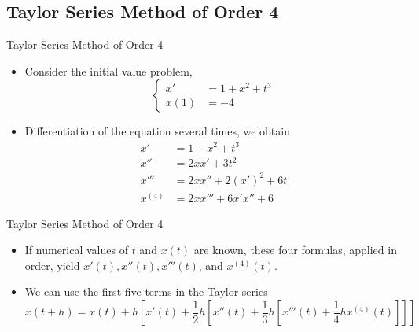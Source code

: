 \documentclass{beamer}
\begin{document}
\subsection[Taylor Series Method of Order 4]{Taylor Series Method of Order 4}
\begin{frame}{Taylor Series Method of Order 4}
\begin{itemize}
\item Consider the initial value problem,
\[
\left\{
\begin{split}
x'&=1+x^2 +t^3\\ 
x(1) &= -4
\end{split}\right.
\]
\item Differentiation of the equation several times, we obtain
\begin{align*}
x'&=1+x^2+t^3\\
x''&=2xx'+3t^2\\
x'''&=2xx''+2(x')^2+6t\\
x^{(4)}&= 2xx'''+6x'x''+6
\end{align*}
\end{itemize}

\end{frame}

\begin{frame}{Taylor Series Method of Order 4}
\begin{itemize}
\item If numerical values of $t$ and $x(t)$ are known, these four formulas, applied in order, yield $x'(t), x''(t), x'''(t)$, and $x^{(4)}(t)$.
\item We can use the first \alert{five} terms in the Taylor series
\[
x(t+h)= x(t)+h\left[x'(t)+\frac{1}{2}h\left[x''(t)+\frac{1}{3}h\left[x'''(t)+\frac{1}{4}hx^{(4)}(t)\right]\right]\right]
\]
\end{itemize}

\end{frame}
\end{document}
